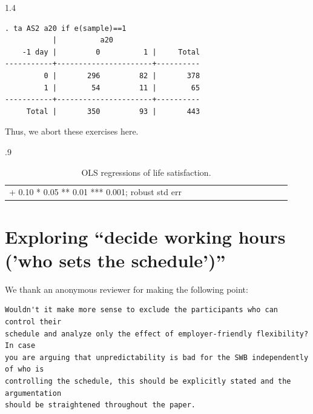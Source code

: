 \documentclass[10pt, letterpaper]{article}
\begin{document}
\begin{spacing}{1.4}
\begin{verbatim}
. ta AS2 a20 if e(sample)==1
           |          a20
    -1 day |         0          1 |     Total
-----------+----------------------+----------
         0 |       296         82 |       378 
         1 |        54         11 |        65 
-----------+----------------------+----------
     Total |       350         93 |       443 
\end{verbatim}


Thus, we abort these exercises here. 


\begin{spacing}{.9} \begin{table}[H]\centering   \begin{scriptsize} \begin{tabular}{p{1.8in}p{.5in}p{.5in}p{.5in}p{.5in}p{.5in}p{.5in}p{.5in}p{.5in}p{.5in}p{.5 in}p{.5in}p{.5 in}}\hline  \hline + 0.10 * 0.05 ** 0.01 *** 0.001; robust std err \end{tabular}\end{scriptsize}\caption{\label{regY3}OLS regressions of life satisfaction.}\end{table} \end{spacing}






\section{Exploring ``decide working hours ('who sets the schedule')''}

We thank an anonymous reviewer for making the following point:

\begin{verbatim}
Wouldn't it make more sense to exclude the participants who can control their
schedule and analyze only the effect of employer-friendly flexibility? In case
you are arguing that unpredictability is bad for the SWB independently of who is
controlling the schedule, this should be explicitly stated and the argumentation
should be straightened throughout the paper. 
\end{verbatim}


\end{spacing}
\end{document}

